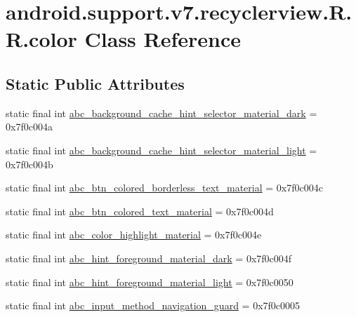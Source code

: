 \hypertarget{classandroid_1_1support_1_1v7_1_1recyclerview_1_1_r_1_1color}{
\section{android.support.v7.recyclerview.R.R.color Class Reference}
\label{classandroid_1_1support_1_1v7_1_1recyclerview_1_1_r_1_1color}
}
\subsection*{Static Public Attributes}
\begin{CompactItemize}
\item 
static final int \hyperlink{classandroid_1_1support_1_1v7_1_1recyclerview_1_1_r_1_1color_7061a06dd65db006848ee2063aced724}{abc\_\-background\_\-cache\_\-hint\_\-selector\_\-material\_\-dark} = 0x7f0c004a
\item 
static final int \hyperlink{classandroid_1_1support_1_1v7_1_1recyclerview_1_1_r_1_1color_5c40a8c89610a4d238c11e3c7958ea01}{abc\_\-background\_\-cache\_\-hint\_\-selector\_\-material\_\-light} = 0x7f0c004b
\item 
static final int \hyperlink{classandroid_1_1support_1_1v7_1_1recyclerview_1_1_r_1_1color_bb5605a801998b7edc2d5992e3a3b60f}{abc\_\-btn\_\-colored\_\-borderless\_\-text\_\-material} = 0x7f0c004c
\item 
static final int \hyperlink{classandroid_1_1support_1_1v7_1_1recyclerview_1_1_r_1_1color_e399e019dcce346699a344e254b2a177}{abc\_\-btn\_\-colored\_\-text\_\-material} = 0x7f0c004d
\item 
static final int \hyperlink{classandroid_1_1support_1_1v7_1_1recyclerview_1_1_r_1_1color_329a6e7b0efd2eee03616ba304bb6e14}{abc\_\-color\_\-highlight\_\-material} = 0x7f0c004e
\item 
static final int \hyperlink{classandroid_1_1support_1_1v7_1_1recyclerview_1_1_r_1_1color_599ff06b47e07c1d478375b0459b7b08}{abc\_\-hint\_\-foreground\_\-material\_\-dark} = 0x7f0c004f
\item 
static final int \hyperlink{classandroid_1_1support_1_1v7_1_1recyclerview_1_1_r_1_1color_f432b6ab248700e459fe7e4bbcab2fec}{abc\_\-hint\_\-foreground\_\-material\_\-light} = 0x7f0c0050
\item 
static final int \hyperlink{classandroid_1_1support_1_1v7_1_1recyclerview_1_1_r_1_1color_0c83c2352b20f58f820dc39c9b6433c9}{abc\_\-input\_\-method\_\-navigation\_\-guard} = 0x7f0c0005

\end{CompactItemize}
